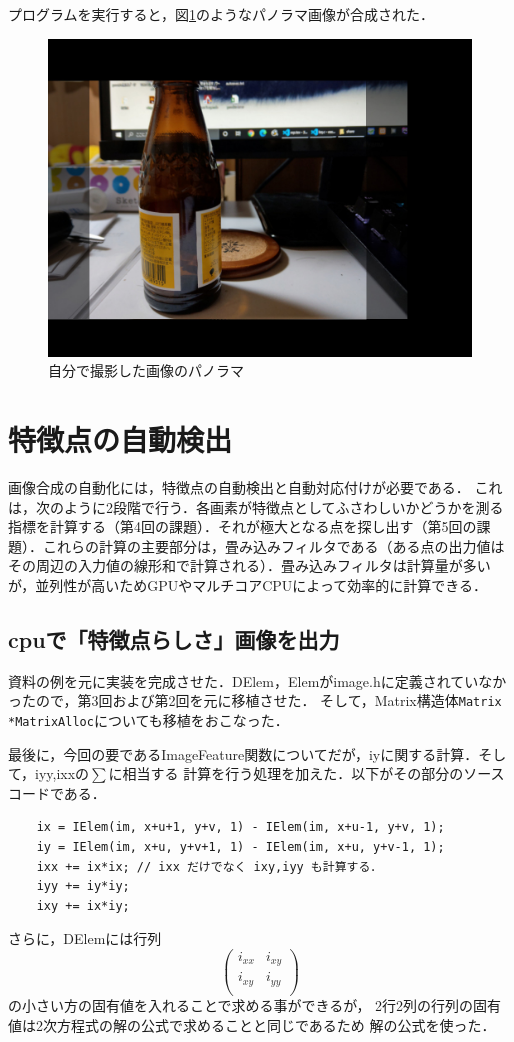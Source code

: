 \documentclass[11pt]{jarticle}
\begin{document}
プログラムを実行すると，図\ref{3-5.jpg}のようなパノラマ画像が合成された．
\begin{figure}[t]
    \centering
    \includegraphics[scale=.5]{3-5.jpg}
    \caption{自分で撮影した画像のパノラマ}
    \label{3-5.jpg}
\end{figure}

\section{特徴点の自動検出}
画像合成の自動化には，特徴点の自動検出と自動対応付けが必要である．
これは，次のように2段階で行う．各画素が特徴点としてふさわしいかどうかを測る指標を計算する（第4回の課題）．それが極大となる点を探し出す（第5回の課題）．これらの計算の主要部分は，畳み込みフィルタである（ある点の出力値はその周辺の入力値の線形和で計算される）．畳み込みフィルタは計算量が多いが，並列性が高いためGPUやマルチコアCPUによって効率的に計算できる．

\subsection{cpuで「特徴点らしさ」画像を出力}

資料の例を元に実装を完成させた．DElem，Elemがimage.hに定義されていなかったので，第3回および第2回を元に移植させた．
そして，Matrix構造体\verb|Matrix *MatrixAlloc|についても移植をおこなった．

最後に，今回の要であるImageFeature関数についてだが，iyに関する計算．そして，iyy,ixxの$\sum$に相当する
計算を行う処理を加えた．以下がその部分のソースコードである．
\begin{verbatim}
    ix = IElem(im, x+u+1, y+v, 1) - IElem(im, x+u-1, y+v, 1);
    iy = IElem(im, x+u, y+v+1, 1) - IElem(im, x+u, y+v-1, 1);
    ixx += ix*ix; // ixx だけでなく ixy,iyy も計算する． 
    iyy += iy*iy;
    ixy += ix*iy;
\end{verbatim}
さらに，DElemには行列
\[
  \left(
    \begin{array}{cc}
      i_{xx} & i_{xy} \\
      i_{xy} & i_{yy} \\
    \end{array}
  \right)
\]
の小さい方の固有値を入れることで求める事ができるが，
2行2列の行列の固有値は2次方程式の解の公式で求めることと同じであるため
解の公式を使った．
\end{document}
